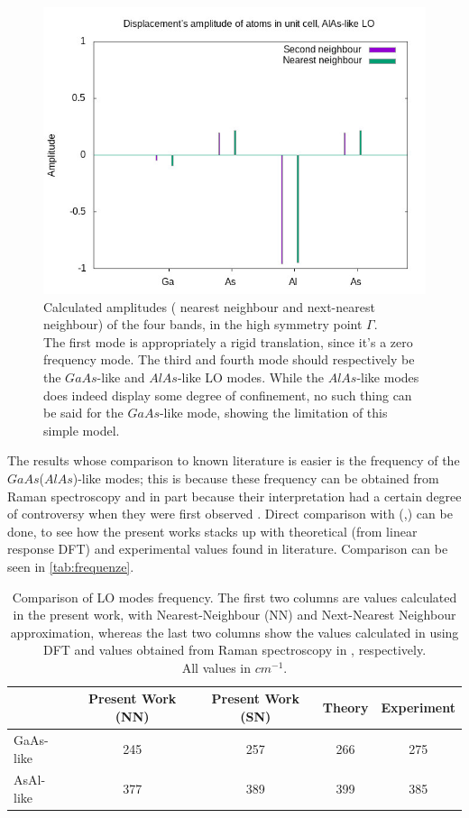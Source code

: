 \documentclass{article}
\begin{document}
\begin{figure}[hp]
	\includegraphics[scale=0.35]{ampiezze4.jpg}
	\caption{Calculated amplitudes ({\color{pinegreen} nearest neighbour} and {\color{plum} next-nearest neighbour})  of the four bands, in the high symmetry point $\Gamma$.\\ The first mode is appropriately a rigid translation, since it's a zero frequency mode. The third and fourth mode should respectively be the $GaAs$-like and $AlAs$-like LO modes. While the $AlAs$-like modes does indeed display some degree of confinement, no such thing can be said for the $GaAs$-like mode, showing the limitation of this simple model.}
	\label{fig:ampiezze}
\end{figure}
The results whose comparison to known literature is easier is the frequency of the $GaAs$($AlAs$)-like modes; this is because these frequency can be obtained from Raman spectroscopy and in part because their interpretation had a certain degree of controversy when they were first observed \cite{Molinari}. Direct comparison with (\cite[Fig.6]{Molinari},\cite{Cardona,Ishibashi}) can be done, to see how the present works stacks up with theoretical (from linear response DFT)  and experimental values found in literature. Comparison can be seen in \autoref{tab:frequenze}.\\
\medskip

\begin{table}
	\centering
	\begin{tabular}{||l|c|c|c|c||}
		\hline
		& Present Work (NN) & Present Work (SN)& Theory \cite{Molinari} & Experiment \cite{Cardona,Ishibashi} \\
			\hline
		GaAs-like & 245 &257 &266&275 \\
		\hline
		AsAl-like & 377 & 389&399&385 \\
		\hline
	\end{tabular}
	\caption{Comparison of LO modes frequency. The first two columns are values calculated in the present work, with Nearest-Neighbour (NN) and Next-Nearest Neighbour approximation, whereas the last two columns show the values calculated in \cite{Molinari} using DFT and values obtained from Raman spectroscopy in \cite{Cardona, Ishibashi}, respectively.\\
	All values in $cm^{-1}$.}
	\label{tab:frequenze}
\end{table}
\end{document}
